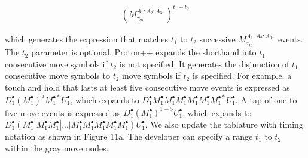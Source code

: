 \documentclass[11pt]{article}
\begin{document}
\vspace*{-.45in}
\LARGE
\begin{align*}
(M_{_{T_{ID}}}^{A_{1}:A_{2}:A_{3^{...}}})^{t_1-t_2}
\end{align*}
\large
\vspace*{-.25in}

which generates the expression that matches $t_1$ to $t_2$ successive $M_{_{T_{ID}}}^{A_{1}:A_{2}:A_{3^{...}}}$ events. The $t_2$ parameter is optional. Proton++ expands the shorthand into $t_1$ consecutive move symbols if $t_2$ is not specified. It generates the disjunction of $t_1$ consecutive move symbols to $t_2$ move symbols if $t_2$ is specified. For example, a touch and hold that lasts at least five consecutive move events is expressed as $D_{1}^{\bullet}(M_{1}^{\bullet})^5M_{1}^{\bullet\ast}U_{1}^{\bullet}$, which expands to $D_{1}^{\bullet}M_{1}^{\bullet}M_{1}^{\bullet}M_{1}^{\bullet}M_{1}^
{\bullet}M_{1}^{\bullet}M_{1}^{\bullet\ast}U_{1}^{\bullet}$. A tap of one to five move events is expressed as $D_{1}^{\bullet}(M_{1}^{\bullet})^{1-5}U_{1}^{\bullet}$, which expands to $D_{1}^{\bullet}(M_{1}^{\bullet}|M_{1}^{\bullet}M_{1}^{\bullet}|...|M_{1}^{\bullet}M_{1}^{\bullet}M_{1}^{\bullet}M_{1}^{\bullet}M_{1}^{\bullet})U_{1}^{\bullet}$. We also update the tablature with timing notation as shown in Figure 11a. The developer can specify a range $t_1$ to $t_2$ within the gray move nodes.
\end{document}

